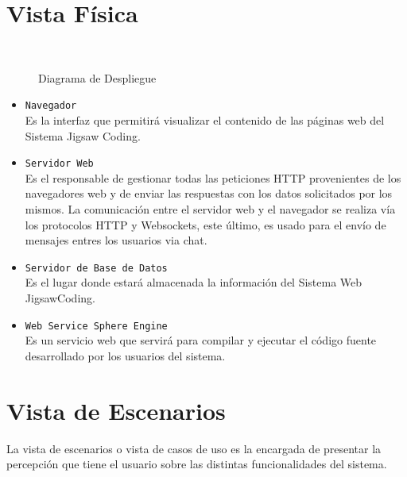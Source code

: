 \section{Vista Física}
\begin{figure}[!h]
  \centering
  \\
  \caption{Diagrama de Despliegue}\label{fig:diagrama_de_despliegue}
\end{figure}
\begin{itemize}
  \item \texttt{Navegador}\\Es la interfaz que permitirá visualizar el contenido de las páginas web del Sistema Jigsaw Coding. 
  \item \texttt{Servidor Web}\\Es el responsable de gestionar todas las peticiones HTTP provenientes de los navegadores web y de enviar las respuestas con los datos solicitados por los mismos. La comunicación entre el servidor web y el navegador se realiza vía los protocolos HTTP y Websockets, este último, es usado para el envío de mensajes entres los usuarios via chat.
  \item \texttt{Servidor de Base de Datos}\\Es el lugar donde estará almacenada la información del Sistema Web JigsawCoding.
  \item \texttt{Web Service Sphere Engine}\\Es un servicio web que servirá para compilar y ejecutar el código fuente desarrollado por los usuarios del sistema.
\end{itemize}
\clearpage
\section{Vista de Escenarios}
La vista de escenarios o vista de casos de uso es la encargada de presentar la percepción que tiene el usuario sobre las distintas funcionalidades del sistema.


